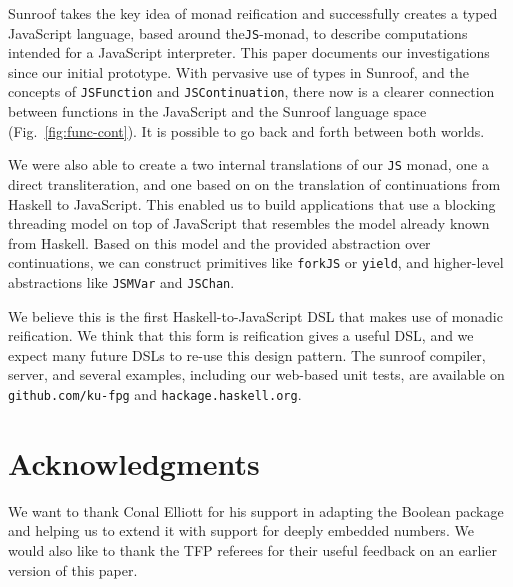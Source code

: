 \documentclass{llncs}
\newcommand{\Src}[1]{{\tt{#1}}}
\newcommand{\JS}{\Src{JS}}
\newcommand{\FigRef}[1]{Fig.~\ref{#1}}
\begin{document}
Sunroof takes the key idea of monad reification and
successfully creates a typed JavaScript language, based around the\JS-monad,
to describe computations intended for a JavaScript interpreter.
This paper documents our investigations since our initial prototype.
With pervasive use of types in Sunroof, and the concepts
of \Src{JSFunction} and \Src{JSContinuation}, there now is a 
clearer connection between
functions in the JavaScript and the Sunroof language space 
(\FigRef{fig:func-cont}). It is possible to go back and forth between 
both worlds. 

We were also able to create a two internal translations of our \JS{} monad,
one a direct transliteration,
and one based on on the translation of continuations from Haskell
to JavaScript. This enabled us to build applications
that use a blocking threading model on top of JavaScript
that resembles the model already known from Haskell.
Based on this model and the provided abstraction over continuations,
we can construct primitives like \Src{forkJS} or \Src{yield},
and higher-level abstractions like \Src{JSMVar} and \Src{JSChan}.

We believe this is the first Haskell-to-JavaScript DSL that 
makes use of monadic reification. We think that this form
is reification gives a useful DSL, and we expect many future
DSLs to re-use this design pattern. The sunroof compiler,
server, and several examples, including our web-based unit tests,
are available on \Src{github.com/ku-fpg} and \Src{hackage.haskell.org}.

%

\section{Acknowledgments}

We want to thank Conal Elliott for his support in adapting 
the Boolean package \cite{project:boolean} and helping us to
extend it with support for deeply embedded numbers. We would
also like to thank the TFP referees for their useful feedback
on an earlier version of this paper.

%
%


\vspace{-0.5cm} %
\end{document}
